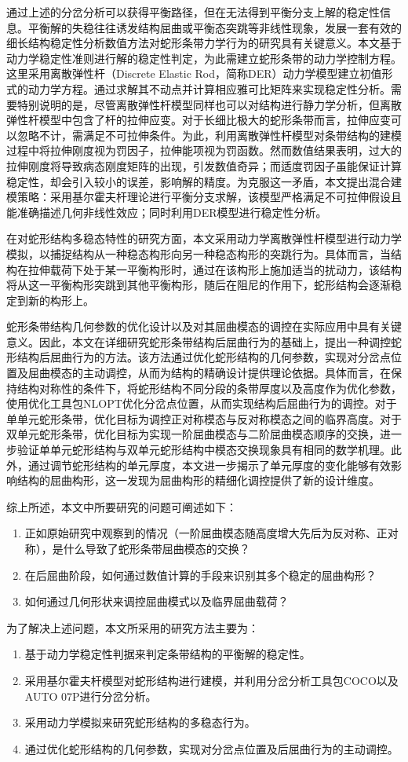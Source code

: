 通过上述的分岔分析可以获得平衡路径，但在无法得到平衡分支上解的稳定性信息。平衡解的失稳往往诱发结构屈曲或平衡态突跳等非线性现象，发展一套有效的细长结构稳定性分析数值方法对蛇形条带力学行为的研究具有关键意义。本文基于动力学稳定性准则进行解的稳定性判定，为此需建立蛇形条带的动力学控制方程。这里采用离散弹性杆（Discrete Elastic Rod，简称DER）动力学模型\cite{jawed2018primer}建立初值形式的动力学方程。通过求解其不动点并计算相应雅可比矩阵来实现稳定性分析。需要特别说明的是，尽管离散弹性杆模型同样也可以对结构进行静力学分析，但离散弹性杆模型中包含了杆的拉伸应变。对于长细比极大的蛇形条带而言，拉伸应变可以忽略不计，需满足不可拉伸条件。为此，利用离散弹性杆模型对条带结构的建模过程中将拉伸刚度视为罚因子，拉伸能项视为罚函数。然而数值结果表明，过大的拉伸刚度将导致病态刚度矩阵的出现，引发数值奇异；而适度罚因子虽能保证计算稳定性，却会引入较小的误差，影响解的精度。为克服这一矛盾，本文提出混合建模策略：采用基尔霍夫杆理论进行平衡分支求解，该模型严格满足不可拉伸假设且能准确描述几何非线性效应；同时利用DER模型进行稳定性分析。

在对蛇形结构多稳态特性的研究方面，本文采用动力学离散弹性杆模型进行动力学模拟，以捕捉结构从一种稳态构形向另一种稳态构形的突跳行为。具体而言，当结构在拉伸载荷下处于某一平衡构形时，通过在该构形上施加适当的扰动力，该结构将从这一平衡构形突跳到其他平衡构形，随后在阻尼的作用下，蛇形结构会逐渐稳定到新的构形上。

蛇形条带结构几何参数的优化设计以及对其屈曲模态的调控在实际应用中具有关键意义。因此，本文在详细研究蛇形条带结构后屈曲行为的基础上，提出一种调控蛇形结构后屈曲行为的方法。该方法通过优化蛇形结构的几何参数，实现对分岔点位置及屈曲模态的主动调控，从而为结构的精确设计提供理论依据。具体而言，在保持结构对称性的条件下，将蛇形结构不同分段的条带厚度以及高度作为优化参数，使用优化工具包NLOPT\cite{NLopt}优化分岔点位置，从而实现结构后屈曲行为的调控。对于单单元蛇形条带，优化目标为调控正对称模态与反对称模态之间的临界高度。对于双单元蛇形条带，优化目标为实现一阶屈曲模态与二阶屈曲模态顺序的交换，进一步验证单单元蛇形结构与双单元蛇形结构中模态交换现象具有相同的数学机理。此外，通过调节蛇形结构的单元厚度，本文进一步揭示了单元厚度的变化能够有效影响结构的屈曲构形，这一发现为屈曲构形的精细化调控提供了新的设计维度。

综上所述，本文中所要研究的问题可阐述如下：
\begin{enumerate}
	\item 正如原始研究\cite{zhang2013buckling}中观察到的情况（一阶屈曲模态随高度增大先后为反对称、正对称），是什么导致了蛇形条带屈曲模态的交换？
	\item 在后屈曲阶段，如何通过数值计算的手段来识别其多个稳定的屈曲构形？
	\item 如何通过几何形状来调控屈曲模式以及临界屈曲载荷？
\end{enumerate}

为了解决上述问题，本文所采用的研究方法主要为：
\begin{enumerate}
    \item 基于动力学稳定性判据来判定条带结构的平衡解的稳定性。
	\item 采用基尔霍夫杆模型对蛇形结构进行建模，并利用分岔分析工具包COCO以及AUTO 07P进行分岔分析。
	\item 采用动力学模拟来研究蛇形结构的多稳态行为。
	\item 通过优化蛇形结构的几何参数，实现对分岔点位置及后屈曲行为的主动调控。
\end{enumerate}

